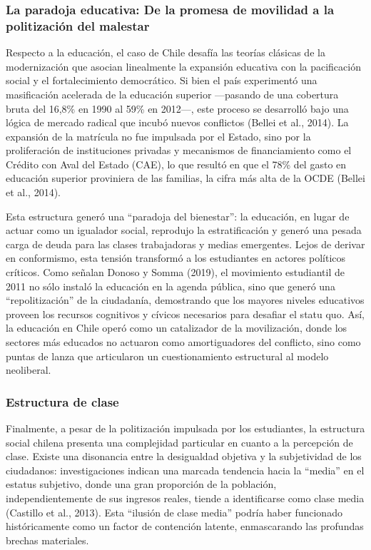 \documentclass[
  13pt,
]{article}
\begin{document}
\subsubsection{La paradoja educativa: De la promesa de movilidad a la
politización del
malestar}\label{la-paradoja-educativa-de-la-promesa-de-movilidad-a-la-politizaciuxf3n-del-malestar}

Respecto a la educación, el caso de Chile desafía las teorías clásicas
de la modernización que asocian linealmente la expansión educativa con
la pacificación social y el fortalecimiento democrático. Si bien el país
experimentó una masificación acelerada de la educación superior
---pasando de una cobertura bruta del 16,8\% en 1990 al 59\% en 2012---,
este proceso se desarrolló bajo una lógica de mercado radical que incubó
nuevos conflictos (Bellei et al., 2014). La expansión de la matrícula no
fue impulsada por el Estado, sino por la proliferación de instituciones
privadas y mecanismos de financiamiento como el Crédito con Aval del
Estado (CAE), lo que resultó en que el 78\% del gasto en educación
superior proviniera de las familias, la cifra más alta de la OCDE
(Bellei et al., 2014).

Esta estructura generó una ``paradoja del bienestar'': la educación, en
lugar de actuar como un igualador social, reprodujo la estratificación y
generó una pesada carga de deuda para las clases trabajadoras y medias
emergentes. Lejos de derivar en conformismo, esta tensión transformó a
los estudiantes en actores políticos críticos. Como señalan Donoso y
Somma (2019), el movimiento estudiantil de 2011 no sólo instaló la
educación en la agenda pública, sino que generó una ``repolitización''
de la ciudadanía, demostrando que los mayores niveles educativos proveen
los recursos cognitivos y cívicos necesarios para desafiar el statu quo.
Así, la educación en Chile operó como un catalizador de la movilización,
donde los sectores más educados no actuaron como amortiguadores del
conflicto, sino como puntas de lanza que articularon un cuestionamiento
estructural al modelo neoliberal.

\subsubsection{Estructura de clase}\label{estructura-de-clase}

Finalmente, a pesar de la politización impulsada por los estudiantes, la
estructura social chilena presenta una complejidad particular en cuanto
a la percepción de clase. Existe una disonancia entre la desigualdad
objetiva y la subjetividad de los ciudadanos: investigaciones indican
una marcada tendencia hacia la ``media'' en el estatus subjetivo, donde
una gran proporción de la población, independientemente de sus ingresos
reales, tiende a identificarse como clase media (Castillo et al., 2013).
Esta ``ilusión de clase media'' podría haber funcionado históricamente
como un factor de contención latente, enmascarando las profundas brechas
materiales.
\end{document}
